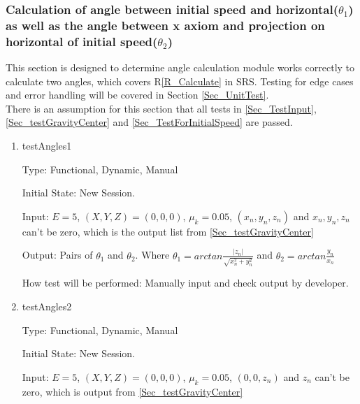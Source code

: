 \documentclass[12pt, titlepage]{article}
\newcommand{\rref}[1]{R\ref{#1}}
\begin{document}
\subsubsection{Calculation of angle between initial speed and horizontal($\theta _{1}$) as well as the angle between x axiom and projection on horizontal of initial speed($\theta _{2}$)}
\label{Sec_TestForAngle}

This section is designed to determine  angle calculation module works correctly to calculate two angles, which covers \rref{R_Calculate} in SRS. Testing for edge cases and error handling will be covered in Section \ref{Sec_UnitTest}.\\
There is an assumption for this section that all tests in \ref{Sec_TestInput}, \ref{Sec_testGravityCenter} and \ref{Sec_TestForInitialSpeed} are passed.
\begin{enumerate}

\item{testAngles1\\}

Type: Functional, Dynamic, Manual

Initial State: New Session.

Input: $E = 5$, $(X,Y,Z) = (0,0,0)$, $\mu_{k} = 0.05$, $(x_{n},y_{n},z_{n})$ and $x_{n},y_{n},z_{n}$ can't be zero, which is the output list from \ref{Sec_testGravityCenter}  

Output: Pairs of $\theta_{1}$ and $\theta_{2}$. Where $\theta_{1}=arctan \frac{|z_{n}|}{\sqrt{x_{n}^2+y_{n}^2}}$ and $\theta_{2}=arctan \frac{y_{n}}{x_{n}}$

How test will be performed: Manually input and check output by developer. 


\item{testAngles2\\}

Type: Functional, Dynamic, Manual

Initial State: New Session.

Input: $E = 5$, $(X,Y,Z) = (0,0,0)$, $\mu_{k} = 0.05$, $(0,0,z_{n})$ and $z_{n}$ can't be zero, which is output from \ref{Sec_testGravityCenter}  


\end{enumerate}
\end{document}
